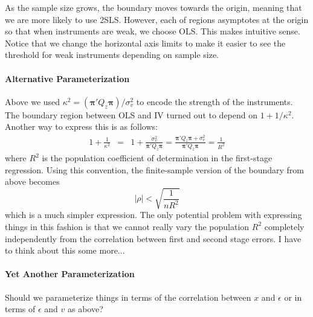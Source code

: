 \documentclass[12pt]{article}
\theoremstyle{definition}
\begin{document}
As the sample size grows, the boundary moves towards the origin, meaning that we are more likely to use 2SLS. However, each of regions asymptotes at the origin so that when instruments are weak, we choose OLS. This makes intuitive sense. Notice that we change the horizontal axis limits to make it easier to see the threshold for weak instruments depending on sample size.

\paragraph{Alternative Parameterization}
Above we used $\kappa^2 = (\boldsymbol{\pi}'Q_z \boldsymbol{\pi})/\sigma_v^2$ to encode the strength of the instruments. The boundary region between OLS and IV turned out to depend on $1 + 1/\kappa^2$. Another way to express this is as follows:
  \begin{eqnarray*}
    1 + \frac{1}{\kappa^2} &=& 1 + \frac{\sigma_v^2}{\boldsymbol{\pi}'Q_z \boldsymbol{\pi}} = \frac{ \boldsymbol{\pi}'Q_z \boldsymbol{\pi} + \sigma_v^2}{\boldsymbol{\pi'}Q_z \boldsymbol{\pi}} = \frac{1}{R^2}
  \end{eqnarray*}
where $R^2$ is the population coefficient of determination in the first-stage regression. Using this convention, the finite-sample version of the boundary from above becomes
    $$|\rho|  < \sqrt{\frac{1}{nR^2} }$$
which is a much simpler expression. The only potential problem with expressing things in this fashion is that we cannot really vary the population $R^2$ completely independently from the correlation between first and second stage errors. I have to think about this some more...

\paragraph{Yet Another Parameterization} Should we parameterize things in terms of the correlation between $x$ and $\epsilon$ or in terms of $\epsilon$ and $v$ as above?

\end{document}
